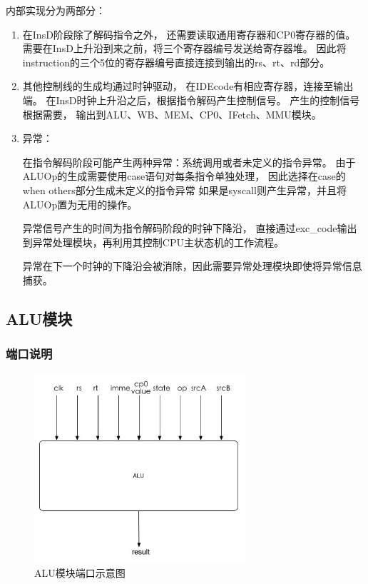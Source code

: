             内部实现分为两部分：%
            \begin{enumerate}
            \item
            在InsD阶段除了解码指令之外，%
            还需要读取通用寄存器和CP0寄存器的值。%
            需要在InsD上升沿到来之前，将三个寄存器编号发送给寄存器堆。%
            因此将instruction的三个5位的寄存器编号直接连接到输出的rs、rt、rd部分。%
            \item
            其他控制线的生成均通过时钟驱动，%
            在IDEcode有相应寄存器，连接至输出端。%
            在InsD时钟上升沿之后，根据指令解码产生控制信号。%
            产生的控制信号根据需要，%
            输出到ALU、WB、MEM、CP0、IFetch、MMU模块。
            \item
            异常：

            在指令解码阶段可能产生两种异常：系统调用或者未定义的指令异常。%
            由于ALUOp的生成需要使用case语句对每条指令单独处理，%
            因此选择在case的when others部分生成未定义的指令异常%
            如果是syscall则产生异常，并且将ALUOp置为无用的操作。%

            异常信号产生的时间为指令解码阶段的时钟下降沿，%
            直接通过exc\_code输出到异常处理模块，再利用其控制CPU主状态机的工作流程。

            异常在下一个时钟的下降沿会被消除，因此需要异常处理模块即使将异常信息捕获。

            \end{enumerate}

    \subsection{ALU模块}
        \subsubsection{端口说明}
            
            \begin{figure}[!hbp]
                \centering
                \caption{ALU模块端口示意图}
                \includegraphics[width=0.7\textwidth]{chart/alu.jpg}
            \end{figure}

